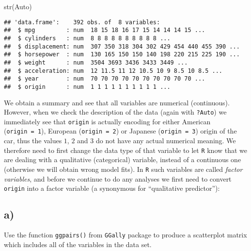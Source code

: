 \documentclass[
]{article}
\newenvironment{Shaded}{\begin{snugshade}}{\end{snugshade}}
\newcommand{\FunctionTok}[1]{\textcolor[rgb]{0.00,0.00,0.00}{#1}}
\newcommand{\NormalTok}[1]{#1}
\newcommand{\OtherTok}[1]{\textcolor[rgb]{0.56,0.35,0.01}{#1}}
\newcommand{\SpecialCharTok}[1]{\textcolor[rgb]{0.00,0.00,0.00}{#1}}
\begin{document}
\begin{Shaded}
\begin{Highlighting}[]
\FunctionTok{str}\NormalTok{(Auto)}
\end{Highlighting}
\end{Shaded}

\begin{verbatim}
## 'data.frame':    392 obs. of  8 variables:
##  $ mpg         : num  18 15 18 16 17 15 14 14 14 15 ...
##  $ cylinders   : num  8 8 8 8 8 8 8 8 8 8 ...
##  $ displacement: num  307 350 318 304 302 429 454 440 455 390 ...
##  $ horsepower  : num  130 165 150 150 140 198 220 215 225 190 ...
##  $ weight      : num  3504 3693 3436 3433 3449 ...
##  $ acceleration: num  12 11.5 11 12 10.5 10 9 8.5 10 8.5 ...
##  $ year        : num  70 70 70 70 70 70 70 70 70 70 ...
##  $ origin      : num  1 1 1 1 1 1 1 1 1 1 ...
\end{verbatim}

We obtain a summary and see that all variables are numerical
(continuous). However, when we check the description of the data (again
with \texttt{?Auto}) we immediately see that \texttt{origin} is actually
encoding for either American (\texttt{origin\ =\ 1}), European
(\texttt{origin\ =\ 2}) or Japanese (\texttt{origin\ =\ 3}) origin of
the car, thus the values \(1\), \(2\) and \(3\) do not have any actual
numerical meaning. We therefore need to first change the data type of
that variable to let \texttt{R} know that we are dealing with a
qualitative (categorical) variable, instead of a continuous one
(otherwise we will obtain wrong model fits). In \texttt{R} such
variables are called \emph{factor variables}, and before we continue to
do any analyses we first need to convert \texttt{origin} into a factor
variable (a synonymous for ``qualitative predictor''):

\begin{Shaded}
\end{Shaded}

\hypertarget{a}{%
\subsection{a)}\label{a}}

Use the function \texttt{ggpairs()} from \texttt{GGally} package to
produce a scatterplot matrix which includes all of the variables in the
data set.
\end{document}
